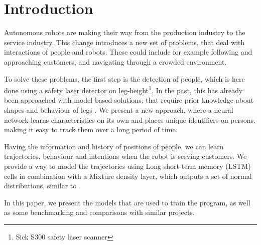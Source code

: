 \section{Introduction}

Autonomous robots are making their way from the production industry to the service industry. This change introduces a new set of problems, that deal with interactions of people and robots. These could include for example following and approaching customers, and navigating through a crowded environment. 

To solve these problems, the first step is the detection of people, which is here done using a safety laser detector on leg-height\footnote{Sick S300 safety laser scanner}. In the past, this has already been approached with model-based solutions, that require prior knowledge about shapes and behaviour of legs \cite{Arras07usingboosted} \cite{weinrich2014people}.
We present a new approach, where a neural network learns characteristics on its own and places unique identifiers on persons, making it easy to track them over a long period of time.

Having the information and history of positions of people, we can learn trajectories, behaviour and intentions when the robot is serving customers. We provide a way to model the trajectories using Long short-term memory (LSTM) cells in combination with a Mixture density layer, which outputs a set of normal distributions, similar to \cite{bishop1994mixture} \cite{graves2013generating}.

In this paper, we present the models that are used to train the program, as well as some benchmarking and comparisons with similar projects.